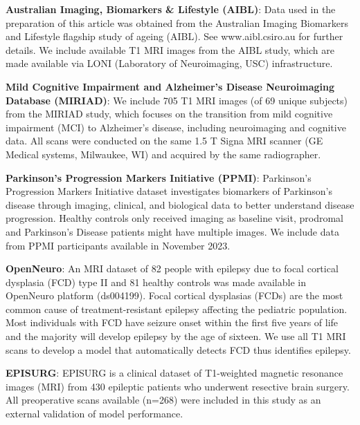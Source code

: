 \documentclass[pdflatex,sn-nature]{sn-jnl}%
\theoremstyle{thmstyleone}%
\theoremstyle{thmstyletwo}%
\theoremstyle{thmstylethree}%
\begin{document}
\begin{appendices}
\textbf{Australian Imaging, Biomarkers \& Lifestyle (AIBL)}\citep{ellis2006australian}: Data used in the preparation of this article was obtained from the Australian Imaging Biomarkers and Lifestyle flagship study of ageing (AIBL). See www.aibl.csiro.au for further details. We include available T1 MRI images from the AIBL study, which are made available via LONI (Laboratory of Neuroimaging, USC) infrastructure. 


\textbf{Mild Cognitive Impairment and Alzheimer’s Disease Neuroimaging Database (MIRIAD)}\citep{malone2013miriad}: We include 705 T1 MRI images (of 69 unique subjects) from the MIRIAD study, which focuses on the transition from mild cognitive impairment (MCI) to Alzheimer's disease, including neuroimaging and cognitive data. All scans were conducted on the same 1.5 T Signa MRI scanner (GE Medical systems, Milwaukee, WI) and acquired by the same radiographer. 



\textbf{Parkinson’s Progression Markers Initiative (PPMI)}\citep{marek2011parkinson}: Parkinson’s Progression Markers Initiative dataset investigates biomarkers of Parkinson’s disease through imaging, clinical, and biological data to better understand disease progression. Healthy controls only received imaging as baseline visit, prodromal and Parkinson’s Disease patients might have multiple images. We include data from PPMI participants available in November 2023.

\textbf{OpenNeuro}\citep{schuch2023open}: An MRI dataset of 82 people with epilepsy due to focal cortical dysplasia (FCD) type II and 81 healthy controls was made available in OpenNeuro platform (ds004199). Focal cortical dysplasias (FCDs) are the most common cause of treatment-resistant epilepsy affecting the pediatric population. Most individuals with FCD have seizure onset within the first five years of life and the majority will develop epilepsy by the age of sixteen. We use all T1 MRI scans to develop a model that automatically detects FCD thus identifies epilepsy.

\textbf{EPISURG}\citep{perez2021self}: EPISURG is a clinical dataset of T1-weighted magnetic resonance images (MRI) from 430 epileptic patients who underwent resective brain surgery. All preoperative scans available (n=268) were included in this study as an external validation of model performance. 



\end{appendices}
\end{document}
